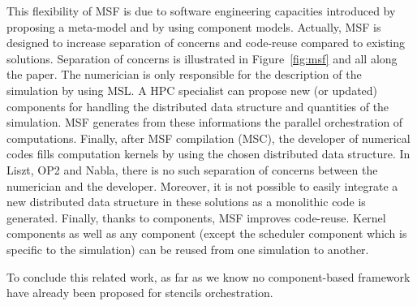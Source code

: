 This flexibility of MSF is due to software engineering capacities introduced by proposing a meta-model and by using component models. Actually, MSF is designed to increase separation of concerns and code-reuse compared to existing solutions.
Separation of concerns is illustrated in Figure~\ref{fig:msf} and all along the paper. The numerician is only responsible for the description of the simulation by using MSL. A HPC specialist can propose new (or updated) components for handling the distributed data structure and quantities of the simulation. MSF generates from these informations the parallel orchestration of computations. Finally, after MSF compilation (MSC), the developer of numerical codes fills computation kernels by using the chosen distributed data structure. In Liszt, OP2 and Nabla, there is no such separation of concerns between the numerician and the developer. 
Moreover, it is not possible to easily integrate a new distributed data structure in these solutions as a monolithic code is generated.
Finally, thanks to components, MSF improves code-reuse. Kernel components as well as any component (except the scheduler component which is specific to the simulation) can be reused from one simulation to another.

To conclude this related work, as far as we know no component-based framework have already been proposed for stencils orchestration.
